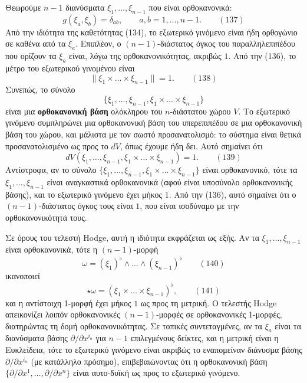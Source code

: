 \documentclass[12pt]{article}
\begin{document}
Θεωρούμε $n-1$ διανύσματα $\xi_1, \dots, \xi_{n-1}$ που είναι ορθοκανονικά:
\begin{equation}
g(\xi_a, \xi_b) = \delta_{ab}, \qquad a, b = 1, \dots, n-1. \qquad (137)
\end{equation}
Από την ιδιότητα της καθετότητας (134), το εξωτερικό γινόμενο είναι ήδη ορθογώνιο σε καθένα από τα $\xi_a$. Επιπλέον, ο $(n-1)$-διάστατος όγκος του παραλληλεπιπέδου που ορίζουν τα $\xi_a$ είναι, λόγω της ορθοκανονικότητας, ακριβώς $1$. Από την (136), το μέτρο του εξωτερικού γινομένου είναι
\begin{equation}
\|\xi_1 \times \dots \times \xi_{n-1}\| = 1. \qquad (138)
\end{equation}
Συνεπώς, το σύνολο
\[
\{\xi_1, \dots, \xi_{n-1}, \xi_1 \times \dots \times \xi_{n-1}\}
\]
είναι μια \textbf{ορθοκανονική βάση} ολόκληρου του $n$-διάστατου χώρου $V$. Το εξωτερικό γινόμενο συμπληρώνει μια ορθοκανονική βάση του υπερεπιπέδου σε μια ορθοκανονική βάση του χώρου, και μάλιστα με τον σωστό προσανατολισμό: το σύστημα είναι θετικά προσανατολισμένο ως προς το $dV$, όπως έχουμε ήδη δει. Αυτό σημαίνει ότι
\begin{equation}
dV(\xi_1, \dots, \xi_{n-1}, \xi_1 \times \dots \times \xi_{n-1}) = 1. \qquad (139)
\end{equation}
Αντίστροφα, αν το σύνολο $\{\xi_1, \dots, \xi_{n-1}, \xi_1 \times \dots \times \xi_{n-1}\}$ είναι ορθοκανονικό, τότε τα $\xi_1, \dots, \xi_{n-1}$ είναι αναγκαστικά ορθοκανονικά (αφού είναι υποσύνολο ορθοκανονικής βάσης), και το εξωτερικό γινόμενο έχει μήκος $1$. Από την (136), αυτό σημαίνει ότι ο $(n-1)$-διάστατος όγκος τους είναι $1$, που είναι ισοδύναμο με την ορθοκανονικότητά τους.

Σε όρους του τελεστή Hodge, αυτή η ιδιότητα εκφράζεται ως εξής. Αν τα $\xi_1, \dots, \xi_{n-1}$ είναι ορθοκανονικά, τότε η $(n-1)$-μορφή
\begin{equation}
\omega = (\xi_1)^\flat \wedge \dots \wedge (\xi_{n-1})^\flat \qquad (140)
\end{equation}
ικανοποιεί
\begin{equation}
\star \omega = (\xi_1 \times \dots \times \xi_{n-1})^\flat, \qquad (141)
\end{equation}
και η αντίστοιχη 1-μορφή έχει μήκος $1$ ως προς τη μετρική. Ο τελεστής Hodge απεικονίζει λοιπόν ορθοκανονικές $(n-1)$-μορφές σε ορθοκανονικές 1-μορφές, διατηρώντας τη δομή ορθοκανονικότητας. Σε τοπικές συντεταγμένες, αν τα $\xi_a$ είναι τα διανύσματα βάσης $\partial / \partial x^{i_a}$ για $n-1$ επιλεγμένους δείκτες, και η μετρική είναι η Ευκλείδεια, τότε το εξωτερικό γινόμενο είναι ακριβώς το εναπομείναν διάνυσμα βάσης $\partial / \partial x^{i_n}$ (με κατάλληλο πρόσημο), επιβεβαιώνοντας ότι η ορθοκανονική βάση $\{\partial / \partial x^1, \dots, \partial / \partial x^n\}$ είναι αυτο-δυϊκή ως προς το εξωτερικό γινόμενο.
\end{document}
